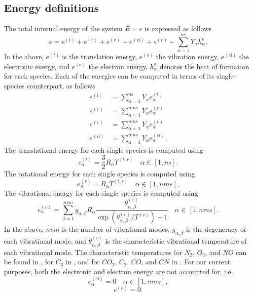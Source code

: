 \documentclass[oneside,a4paper,11pt]{report}
\begin{document}
\subsection{Energy definitions}
The total internal energy of the system $E=e$ is expressed as follows
\begin{equation}
e = e^{(t)} + e^{(r)} + e^{(v)} + e^{(el)} + e^{(e)} + \sum_{\alpha =1}^{ns} Y_\alpha h_\alpha^o .
\end{equation}
In the above, $e^{(t)}$ is the translation energy, $e^{(v)}$ the vibration energy, $e^{(el)}$ the electronic energy, and $e^{(e)}$ the electron energy. $h_\alpha^o$ denotes the heat of formation for each species. Each of the energies can be computed in terms of its single-species counterpart, as follows
\begin{align}
e^{(t)} &= \sum_{\alpha =1}^{ns} Y_\alpha e^{(t)}_\alpha \\
e^{(r)} & = \sum_{\alpha = 1}^{nms} Y_\alpha e^{(r)}_\alpha \\
e^{(v)} & = \sum_{\alpha =1}^{nms} Y_\alpha e^{(v)}_\alpha \\
e^{(el)} & = \sum_{\alpha =1}^{nms} Y_\alpha e^{(el)}_\alpha.
\end{align}
The translational energy for each single species is computed using
\begin{equation}
e^{(t)}_\alpha = \frac{3}{2} R_\alpha T^{(t,r)} \quad \alpha \in [1,ns].
\end{equation}
The rotational energy for each single species is computed using
\begin{equation}
e^{(r)}_\alpha = R_\alpha T^{(t,r)} \quad \alpha \in [1,nms].
\end{equation}
The vibrational energy for each single species is computed using
\begin{equation}
e^{(v)}_\alpha = \sum_{\beta = 1}^{nvm} g_{\alpha,\beta}R_\alpha \frac{\theta^{(v)}_{\alpha,\beta}}{\exp \left ( \theta^{(v)}_{\alpha,\beta} / T^{(v)} \right ) - 1} \quad \alpha \in [1,nms].
\end{equation}
In the above, $nvm$ is the number of vibrational modes, $g_{\alpha,\beta}$ is the degeneracy of each vibrational mode, and $\theta^{(v)}_{\alpha,\beta}$ is the characteristic vibrational temperature of each vibrational mode. The characteristic temperatures for $N_2$, $O_2$, and $NO$ can be found in \cite{park1990}, for $C_3$ in \cite{dolton1968}, and for $CO_2$, $C_2$, $CO$, and $CN$ in \cite{mcbride1963}. For our current purposes, both the electronic and electron energy are not accounted for, i.e.,
\begin{equation}
e^{(el)}_\alpha = 0  \quad \alpha \in [1,nms],
\end{equation}
\begin{equation}
e^{(e)} = 0.
\end{equation}
\end{document}
